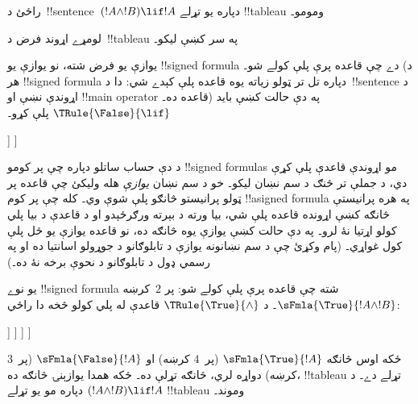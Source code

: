 \documentclass[../../../include/open-logic-section]{subfiles}
\begin{document}
      {}
      {}


\begin{ex}
راځئ د~!!{sentence}~$(!A \land !B) \lif !A$ دپاره يو تړلے
!!{tableau} ومومو۔

لومړے اړوند فرض د~!!{tableau} په سر کښې ليکو۔
\begin{oltableau}
  [\sFmla{\False}{(\formula{A} \land \formula{B}) \lif \formula{A}},
    just = \TAss]
\end{oltableau}

يوازې يو فرض شته، نو يوازې يو !!{signed formula} دے چې قاعده پرې
پلې کولے شو۔ (د هر !!{signed formula} دپاره تل تر ټولو زياته يوه
قاعده پلې کېدے شي: دا د~!!{sentence} د اړوندې نښې او
!!{main operator} قاعده ده۔) په دې حالت کښې بايد
$\TRule{\False}{\lif}$ پلې کړو۔
\begin{oltableau}
  [\sFmla{\False}{(\formula{A} \land \formula{B}) \lif \formula{A}},
    checked, just = \TAss
    [\sFmla{\True}{\formula{A} \land \formula{B}},
      just={\TRule{\False}{\lif}[1]}
      [\sFmla{\False}{\formula{A}}, just={\TRule{\False}{\lif}[1]}]
    ]
  ]
\end{oltableau}
د دې حساب ساتلو دپاره چې پر کومو !!{signed formula}s مو اړوندې
قاعدې پلې کړې دي، د جملې تر څنګ د سم نښان ليکو۔ خو د سم نښان
\emph{يوازې} هله وليکئ چې قاعده پر ټولو پرانيستو څانګو پلې شوې
وي۔ کله چې پر کوم !!a{signed formula} په هره پرانيستې څانګه کښې
اړونده قاعده پلې شي، بيا ورته د بېرته ورګرځېدو او د قاعدې د بيا
پلي کولو اړتيا نۀ لرو۔ په دې حالت کښې يوازې يوه څانګه ده، نو قاعده
يوازې يو ځل پلې کول غواړي۔ (پام وکړئ چې د سم نښانونه يوازې د
تابلوګانو د جوړولو اسانتيا ده او په رسمي ډول د تابلوګانو د نحوې
برخه نۀ ده۔)

يو نوے !!{signed formula} شته چې قاعده پرې پلې کولے شو: پر
$2$~کرښه $\sFmla{\True}{!A \land !B}$۔ د
$\TRule{\True}{\land}$ قاعدې له پلي کولو څخه دا راځي:
\begin{oltableau}
  [\sFmla{\False}{(\formula{A} \land \formula{B}) \lif \formula{A}},
    checked, just = \TAss
    [\sFmla{\True}{\formula{A} \land \formula{B}},
      just={\TRule{\False}{\lif}[1]}, checked
      [\sFmla{\False}{\formula{A}}, just={\TRule{\False}{\lif}[1]}
        [\sFmla{\True}{\formula{A}}, just={\TRule{\True}{\land}[2]}
          [\sFmla{\True}{\formula{B}}, just={\TRule{\True}{\land}[2]}, close
          ]
        ]
      ]
    ]
  ]
\end{oltableau}
ځکه اوس څانګه $\sFmla{\True}{!A}$ (پر~$4$ کرښه) او
$\sFmla{\False}{!A}$ (پر~$3$ کرښه) دواړه لري، څانګه تړلې ده۔
ځکه همدا يوازېنۍ څانګه ده، !!{tableau} تړلے دے۔ د
$(!A \land !B) \lif !A$ دپاره مو يو تړلے !!{tableau} وموند۔
\end{ex}
\end{document}
